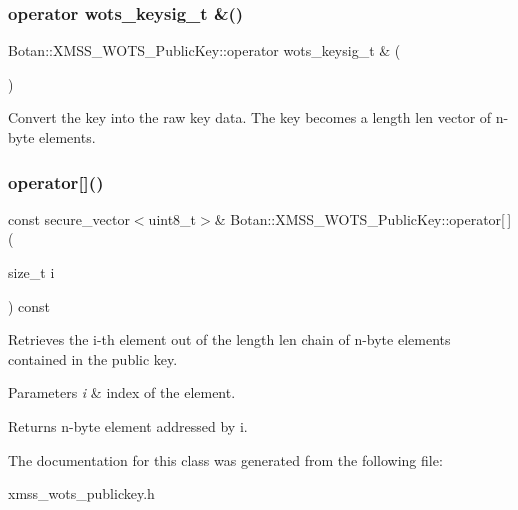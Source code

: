 \subsubsection{\texorpdfstring{operator wots\+\_\+keysig\+\_\+t \&()}{operator wots\_keysig\_t \&()}}
{\footnotesize\ttfamily Botan\+::\+X\+M\+S\+S\+\_\+\+W\+O\+T\+S\+\_\+\+Public\+Key\+::operator wots\+\_\+keysig\+\_\+t \& (\begin{DoxyParamCaption}{ }\end{DoxyParamCaption})\hspace{0.3cm}{\ttfamily [inline]}}

Convert the key into the raw key data. The key becomes a length len vector of n-\/byte elements. \mbox{\label{class_botan_1_1_x_m_s_s___w_o_t_s___public_key_ae4e237a93bd043f4b34e02c03bfa1559}} 
\subsubsection{\texorpdfstring{operator[]()}{operator[]()}}
{\footnotesize\ttfamily const secure\+\_\+vector$<$uint8\+\_\+t$>$\& Botan\+::\+X\+M\+S\+S\+\_\+\+W\+O\+T\+S\+\_\+\+Public\+Key\+::operator\mbox{[}$\,$\mbox{]} (\begin{DoxyParamCaption}\item[{size\+\_\+t}]{i }\end{DoxyParamCaption}) const\hspace{0.3cm}{\ttfamily [inline]}}

Retrieves the i-\/th element out of the length len chain of n-\/byte elements contained in the public key.


\begin{DoxyParams}{Parameters}
{\em i} & index of the element. \\
\hline
\end{DoxyParams}
\begin{DoxyReturn}{Returns}
n-\/byte element addressed by i. 
\end{DoxyReturn}


The documentation for this class was generated from the following file\+:\begin{DoxyCompactItemize}
\item 
xmss\+\_\+wots\+\_\+publickey.\+h\end{DoxyCompactItemize}
